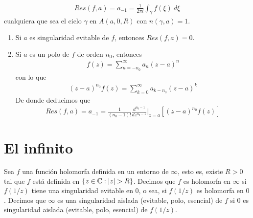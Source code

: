 \begin{obs}
\begin{enumerate}
              \begin{align*}
                  \boxed{
                      Res(f,a) = a_{-1} = \frac{1}{2\pi i} \int_{\gamma} f(\xi) \ d \xi
                  }
              \end{align*}
              cualquiera que sea el ciclo $\gamma$ en $A(a,0,R)$ con $n(\gamma,a) = 1$.
              \begin{enumerate}
                  \item Si $a$ es singularidad evitable de $f$, entonces $Res(f,a) = 0$.
                  \item Si $a$ es un polo de $f$ de orden $n_0$, entonces
                        \begin{align*}
                            f(z) = \sum_{n = -n_0}^{\infty}{a_n(z-a)^n}
                        \end{align*}
                        con lo que
                        \begin{align*}
                            (z-a)^{n_0}f(z) = \sum_{k = 0}^{\infty}{a_{k-n_0}(z-a)^k}
                        \end{align*}
                        De donde deducimos que
                        \begin{align*}
                            \boxed{
                            Res(f,a) = a_{-1} = \frac{1}{(n_0-1)!} \frac{d^{n_0-1}}{dz^{n_0 - 1}}\Big|_{z=a} \left[ (z-a)^{n_0}f(z)\right]
                            }
                        \end{align*}
              \end{enumerate}
    \end{enumerate}
\end{obs}

\section{El infinito}

\begin{defi}
    Sea $f$ una función holomorfa definida en un entorno de $\infty$, esto es, existe $R>0$ tal que $f$ está definida en $\{z \in \mathbb{C} : |z| > R \}$. Decimos que $f$ es holomorfa en $\infty$ si $f(1/z)$ tiene una singularidad evitable en $0$, o sea, si $f(1/z)$ es holomorfa en $0$. Decimos que $\infty$ es una singularidad aislada (evitable, polo, esencial) de $f$ si $0$ es singularidad aislada (evitable, polo, esencial) de $f(1/z)$.
\end{defi}

